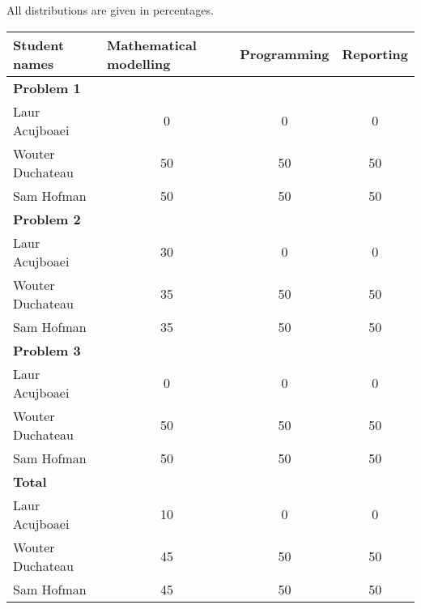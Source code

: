 \documentclass[]{article}
\begin{document}
All distributions are given in percentages.

\begin{table}[h!]
	\centering

	\label{my-label}
	\begin{tabular}{lccc}
		\hline
		\textbf{Student names} & \multicolumn{1}{l}{\textbf{Mathematical modelling}} & \multicolumn{1}{l}{\textbf{Programming}} & \multicolumn{1}{l}{\textbf{Reporting}} \\ \hline
		\textbf{Problem 1} & \multicolumn{1}{l}{} & \multicolumn{1}{l}{} & \multicolumn{1}{l}{} \\
		Laur Acujboaei & 0 & 0 & 0 \\
		Wouter Duchateau & 50 & 50 & 50 \\
		Sam Hofman & 50 & 50 & 50 \\ \hline
		\textbf{Problem 2} &  &  &  \\
		Laur Acujboaei & 30 & 0 & 0 \\
		Wouter Duchateau & 35 & 50 & 50 \\
		Sam Hofman & 35 & 50 & 50 \\ \hline
		\textbf{Problem 3} &  &  &  \\
		Laur Acujboaei & 0 & 0 & 0 \\
		Wouter Duchateau & 50 & 50 & 50 \\
		Sam Hofman & 50 & 50 & 50 \\ \hline
		\textbf{Total} & \multicolumn{1}{l}{} & \multicolumn{1}{l}{} & \multicolumn{1}{l}{} \\
		Laur Acujboaei & 10 & 0 & 0 \\
		Wouter Duchateau & 45 & 50 & 50 \\
		Sam Hofman & 45 & 50 & 50 \\ \hline
	\end{tabular}
\end{table}
\end{document}

